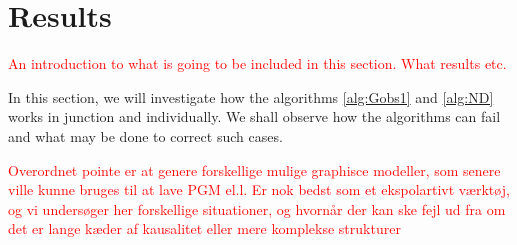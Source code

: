 \documentclass[../Thesis.tex]{subfiles}
\begin{document}
\chapter{Results}\label{chap:results}
\textcolor{red}{An introduction to what is going to be included in this section. What results etc.}

In this section, we will investigate how the algorithms \autoref{alg:Gobs1} and \autoref{alg:ND} works in junction and individually. We shall observe how the algorithms can fail and what may be done to correct such cases.

\textcolor{red}{Overordnet pointe er at genere forskellige mulige graphisce modeller, som senere ville kunne bruges til at lave PGM el.l. Er nok bedst som et ekspolartivt værktøj, og vi undersøger her forskellige situationer, og hvornår der kan ske fejl ud fra om det er lange kæder af kausalitet eller mere komplekse strukturer}



\newpage
\end{document}
